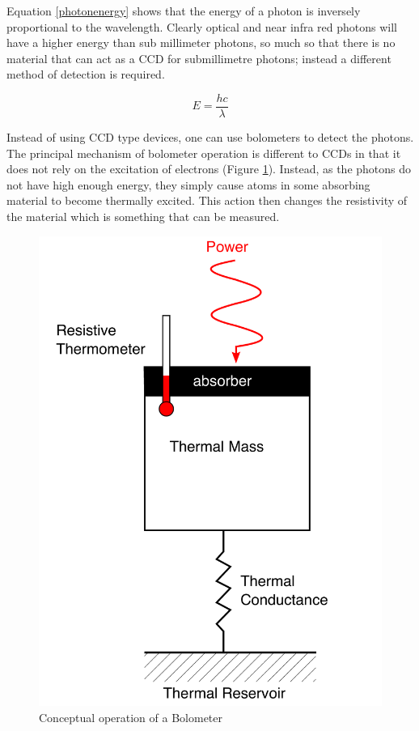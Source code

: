 Equation \ref{photonenergy} shows that the energy of a photon is inversely proportional to the wavelength. Clearly optical and near infra red photons will have a higher energy than sub millimeter photons, so much so that there is no material that can act as a CCD for submillimetre photons; instead a different method of detection is required.

\begin{equation}
    E = \frac{hc}{\lambda}
    \label{photonenergy}
\end{equation}

Instead of using CCD type devices, one can use bolometers to detect the photons. The principal mechanism of bolometer operation is different to CCDs in that it does not rely on the excitation of electrons (Figure \ref{bolometer}). Instead, as the photons do not have high enough energy, they simply cause atoms in some absorbing material to become thermally excited. This action then changes the resistivity of the material which is something that can be measured.

\begin{figure}[H]
    \centering
    \includegraphics[width=0.8\linewidth]{figures/bolometer.pdf}
    \caption[Conceptual operation of a Bolometer]{Conceptual operation of a Bolometer \citep{bolometerSchematic}}
    \label{bolometer}
\end{figure}

